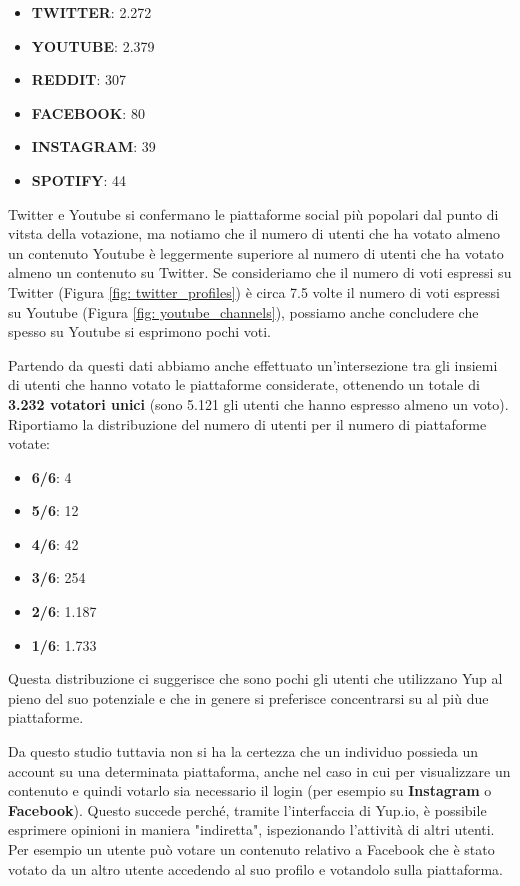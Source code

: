 \begin{itemize}
    \item \textbf{TWITTER}: 2.272
    \item \textbf{YOUTUBE}: 2.379
    \item \textbf{REDDIT}: 307
    \item \textbf{FACEBOOK}: 80
    \item \textbf{INSTAGRAM}: 39
    \item \textbf{SPOTIFY}: 44
\end{itemize}

Twitter e Youtube si confermano le piattaforme social più popolari dal punto di vitsta della votazione, ma notiamo che il numero di utenti che ha votato almeno un contenuto Youtube è leggermente superiore al numero di utenti che ha votato almeno un contenuto su Twitter.
Se consideriamo che il numero di voti espressi su Twitter (Figura \ref{fig: twitter_profiles}) è circa 7.5 volte il numero di voti espressi su Youtube (Figura \ref{fig: youtube_channels}), possiamo anche concludere che spesso su Youtube si esprimono pochi voti.

Partendo da questi dati abbiamo anche effettuato un'intersezione tra gli insiemi di utenti che hanno votato le piattaforme considerate, ottenendo un totale di \textbf{3.232 votatori unici} (sono 5.121 gli utenti che hanno espresso almeno un voto). Riportiamo la distribuzione del numero di utenti per il numero di piattaforme votate:

\begin{itemize}
    \item \textbf{6/6}: 4
    \item \textbf{5/6}: 12
    \item \textbf{4/6}: 42
    \item \textbf{3/6}: 254
    \item \textbf{2/6}: 1.187
    \item \textbf{1/6}: 1.733
\end{itemize}

Questa distribuzione ci suggerisce che sono pochi gli utenti che utilizzano Yup al pieno del suo potenziale e che in genere si preferisce concentrarsi su al più due piattaforme. 

Da questo studio tuttavia non si ha la certezza che un individuo possieda un account su una determinata piattaforma, anche nel caso in cui per visualizzare un contenuto e quindi votarlo sia necessario il login (per esempio su \textbf{Instagram} o \textbf{Facebook}).
Questo succede perché, tramite l'interfaccia di Yup.io, è possibile esprimere opinioni in maniera "indiretta", ispezionando l'attività di altri utenti. Per esempio un utente può votare un contenuto relativo a Facebook che è stato votato da un altro utente accedendo al suo profilo e votandolo sulla piattaforma.


